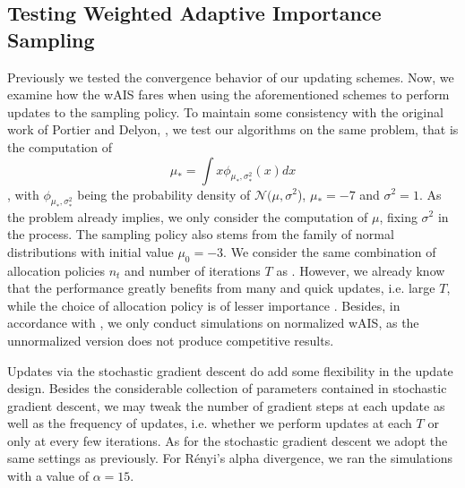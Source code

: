 \subsection{Testing Weighted Adaptive Importance Sampling}

Previously we tested the convergence behavior of our updating schemes. Now, we examine how the wAIS fares when using the aforementioned schemes to perform updates to the sampling policy. To maintain some consistency with the original work of Portier and Delyon, \cite{portierdelyonWAIS}, we test our algorithms on the same problem, that is the computation of $$\mu_* = \displaystyle \int x \phi_{\mu_*, \sigma_*^2}(x)dx$$, with $\phi_{\mu_*, \sigma_*^2}$ being the probability density of  $\mathcal{N}(\mu, \sigma^2$), $\mu_* = -7$ and $\sigma^2 = 1$. As the problem already implies, we only consider the computation of $\mu$, fixing $\sigma^2$ in the process. The sampling policy also stems from the family of normal distributions with initial value $\mu_0 = -3$. We consider the same combination of allocation policies $n_t$ and number of iterations $T$ as \cite{portierdelyonWAIS}. However, we already know that the performance greatly benefits from many and quick updates, i.e. large $T$, while the choice of allocation policy is of lesser importance \cite{portierdelyonWAIS}.  Besides, in accordance with \cite{portierdelyonWAIS}, we only conduct simulations on normalized wAIS, as the unnormalized version does not produce competitive results. 

Updates via the stochastic gradient descent do add some flexibility in the update design. Besides the considerable collection of parameters contained in stochastic gradient descent, we may tweak the number of gradient steps at each update as well as the frequency of updates, i.e. whether we perform updates at each $T$ or only at every few iterations. As for the stochastic gradient descent we adopt the same settings as previously. 
For Rényi's alpha divergence, we ran the simulations with a value of $\alpha = 15$.

